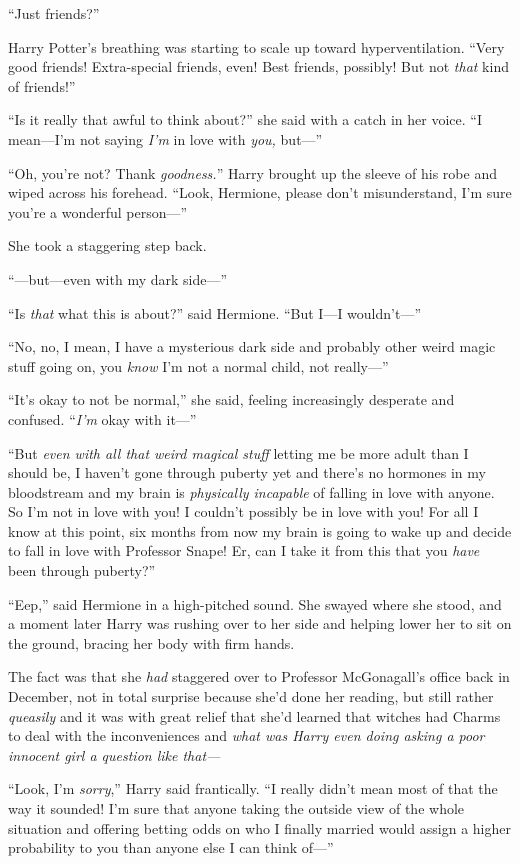 “Just friends?”

Harry Potter’s breathing was starting to scale up toward hyperventilation. “Very good friends! Extra-special friends, even! Best friends, possibly! But not \emph{that} kind of friends!”

“Is it really that awful to think about?” she said with a catch in her voice. “I mean—I’m not saying \emph{I’m} in love with \emph{you,} but—”

“Oh, you’re not? Thank \emph{goodness.}” Harry brought up the sleeve of his robe and wiped across his forehead. “Look, Hermione, please don’t misunderstand, I’m sure you’re a wonderful person—”

She took a staggering step back.

“—but—even with my dark side—”

“Is \emph{that} what this is about?” said Hermione. “But I—I wouldn’t—”

“No, no, I mean, I have a mysterious dark side and probably other weird magic stuff going on, you \emph{know} I’m not a normal child, not really—”

“It’s okay to not be normal,” she said, feeling increasingly desperate and confused. “\emph{I’m} okay with it—”

“But \emph{even with all that weird magical stuff} letting me be more adult than I should be, I haven’t gone through puberty yet and there’s no hormones in my bloodstream and my brain is \emph{physically incapable} of falling in love with anyone. So I’m not in love with you! I couldn’t possibly be in love with you! For all I know at this point, six months from now my brain is going to wake up and decide to fall in love with Professor Snape! Er, can I take it from this that you \emph{have} been through puberty?”

“Eep,” said Hermione in a high-pitched sound. She swayed where she stood, and a moment later Harry was rushing over to her side and helping lower her to sit on the ground, bracing her body with firm hands.

The fact was that she \emph{had} staggered over to Professor McGonagall’s office back in December, not in total surprise because she’d done her reading, but still rather \emph{queasily} and it was with great relief that she’d learned that witches had Charms to deal with the inconveniences and \emph{what was Harry even doing asking a poor innocent girl a question like that—}

“Look, I’m \emph{sorry},” Harry said frantically. “I really didn’t mean most of that the way it sounded! I’m sure that anyone taking the outside view of the whole situation and offering betting odds on who I finally married would assign a higher probability to you than anyone else I can think of—”

